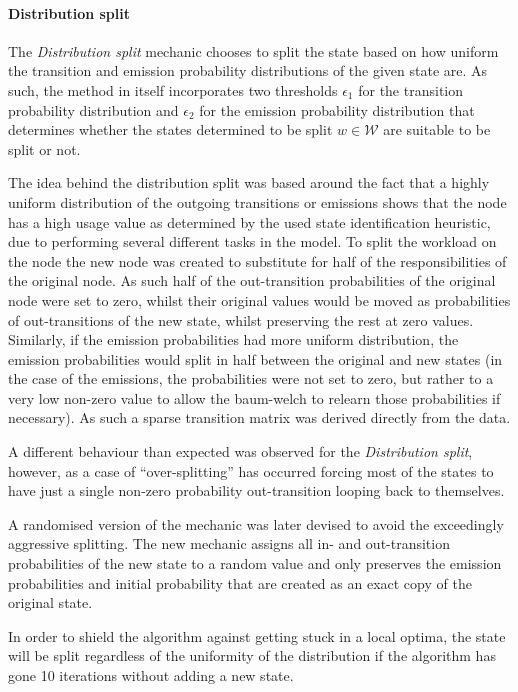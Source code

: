 \paragraph{Distribution split}
The \emph{Distribution split} mechanic chooses to split the state based on how uniform the transition and emission probability distributions of the given state are. As such, the method in itself incorporates two thresholds $\epsilon_1$ for the transition probability distribution and $\epsilon_2$ for the emission probability distribution that determines whether the states determined to be split $w\in\mathcal{W}$ are suitable to be split or not.

The idea behind the distribution split was based around the fact that a highly uniform distribution of the outgoing transitions or emissions shows that the node has a high usage value as determined by the used state identification heuristic, due to performing several different tasks in the model. To split the workload on the node the new node was created to substitute for half of the responsibilities of the original node. As such half of the out-transition probabilities of the original node were set to zero, whilst their original values would be moved as probabilities of out-transitions of the new state, whilst preserving the rest at zero values. Similarly, if the emission probabilities had more uniform distribution, the emission probabilities would split in half between the original and new states (in the case of the emissions, the probabilities were not set to zero, but rather to a very low non-zero value to allow the \gls{baum-welch} to relearn those probabilities if necessary). As such a sparse transition matrix was derived directly from the data.

A different behaviour than expected was observed for the \emph{Distribution split}, however, as a case of ``over-splitting'' has occurred forcing most of the states to have just a single non-zero probability out-transition looping back to themselves.

A randomised version of the mechanic was later devised to avoid the exceedingly aggressive splitting. The new mechanic assigns all in- and out-transition probabilities of the new state to a random value and only preserves the emission probabilities and initial probability that are created as an exact copy of the original state.

In order to shield the algorithm against getting stuck in a local optima, the state will be split regardless of the uniformity of the distribution if the algorithm has gone 10 iterations without adding a new state.

